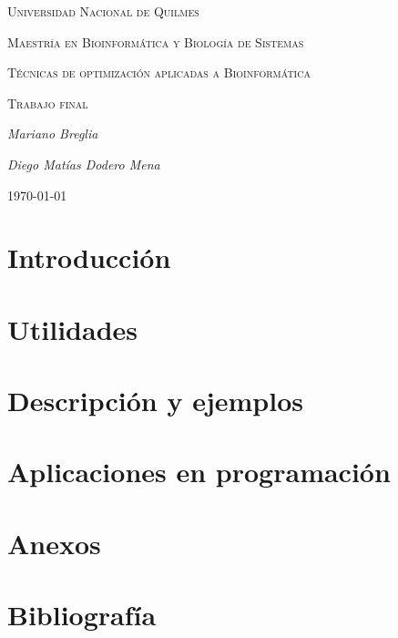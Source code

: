 \documentclass[11pt,a4paper]{article}
\begin{document}
\begin{titlepage}
	\centering
	{\scshape\LARGE Universidad Nacional de Quilmes\par}
	\vspace{1cm}
	{\scshape\LARGE Maestría en Bioinformática y Biología de Sistemas\par}
	\vspace{1cm}
	{\scshape\LARGE Técnicas de optimización aplicadas a Bioinformática}
	\vspace{1cm}
	{\scshape\Large Trabajo final\par}
	\vspace{1.5cm}
	{\Large\itshape Mariano Breglia\par}
	{\Large\itshape Diego Matías Dodero Mena\par}

	\vfill

	{\large \today\par}

\end{titlepage}

\section{Introducción}
\section{Utilidades}
\section{Descripción y ejemplos}
\section{Aplicaciones en programación}
\section{Anexos}
\section{Bibliografía}
\end{document}
